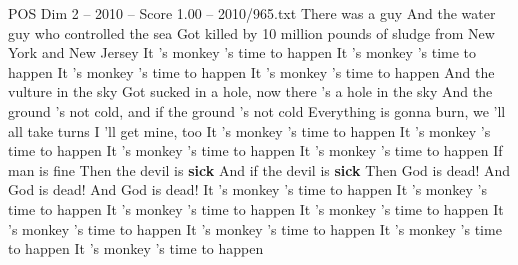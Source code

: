 \begin{textsample}{POS Dim 2 – 2010 – Score 1.00 – 2010/965.txt}  \label{ex:f2_pos_040}
There was a guy And the water guy who controlled the sea Got killed by 10 million pounds of sludge from New York and New Jersey It 's monkey 's time to happen It 's monkey 's time to happen It 's monkey 's time to happen It 's monkey 's time to happen And the vulture in the sky Got sucked in a hole, now there 's a hole in the sky And the ground 's not cold, and if the ground 's not cold Everything is gonna burn, we 'll all take turns I 'll get mine, too It 's monkey 's time to happen It 's monkey 's time to happen It 's monkey 's time to happen It 's monkey 's time to happen If man is fine Then the devil is \textbf{sick} And if the devil is \textbf{sick} Then God is dead!
And God is dead!
And God is dead!
It 's monkey 's time to happen It 's monkey 's time to happen It 's monkey 's time to happen It 's monkey 's time to happen It 's monkey 's time to happen It 's monkey 's time to happen It 's monkey 's time to happen It 's monkey 's time to happen

\end{textsample}
